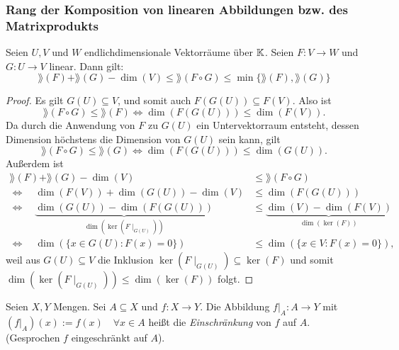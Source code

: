\subsubsection{Rang der Komposition von linearen Abbildungen bzw. des Matrixprodukts}

\begin{thm}
	Seien $ U,V $ und $ W $ endlichdimensionale Vektorräume über $ \mathbb K $. Seien $ F : V \to W $ und $ G : U \to V $ linear. Dann gilt:
	\begin{equation}
		\rang(F) + \rang(G) - \dim(V) \leq \rang(F \circ G) \leq \min\{ \rang(F), \rang(G) \}
	\end{equation}
\end{thm}
\begin{proof}
	Es gilt $ G(U) \subseteq V $, und somit auch $ F(G(U)) \subseteq F(V) $. Also ist
	\begin{equation*}
		\rang(F \circ G) \leq \rang(F) \Leftrightarrow \dim(F(G(U))) \leq \dim(F(V)).
	\end{equation*}
	Da durch die Anwendung von $ F $ zu $ G(U) $ ein Untervektorraum entsteht, dessen Dimension höchstens die Dimension von $ G(U) $ sein kann, gilt
	\begin{equation*}
		\rang(F \circ G) \leq \rang(G) \Leftrightarrow \dim(F(G(U))) \leq \dim(G(U)).
	\end{equation*}
	Außerdem ist
	\begin{align*}
		\rang(F) + \rang(G) - \dim(V) &\leq \rang(F \circ G) \\
		\Leftrightarrow \quad \dim(F(V)) + \dim(G(U)) - \dim(V) &\leq \dim(F(G(U))) \\
		\Leftrightarrow \quad \underbrace{\dim(G(U)) - \dim(F(G(U)))}_{\dim(\ker(F\mid_{G(U)}))} &\leq \underbrace{\dim(V) - \dim(F(V))}_{\dim(\ker(F))} \\
		\Leftrightarrow \quad \dim(\{ x \in G(U) : F(x) = 0 \}) &\leq \dim(\{ x \in V : F(x) = 0 \}),
	\end{align*}
	weil aus $ G(U) \subseteq V $ die Inklusion $ \ker(F\mid_{G(U)}) \subseteq \ker(F) $ und somit $ \dim(\ker(F\mid_{G(U)})) \leq \dim(\ker(F)) $ folgt.
\end{proof}

\begin{bem}
	Seien $ X,Y $ Mengen. Sei $ A \subseteq X $ und $ f : X \to Y $. Die Abbildung $ f|_A : A \to Y $ mit $ (f|_A)(x) := f(x) \quad \forall x \in A $ heißt die \emph{Einschränkung} von $ f $ auf $ A $. (Gesprochen \glqq $ f $ eingeschränkt auf $ A $\grqq).
\end{bem}

